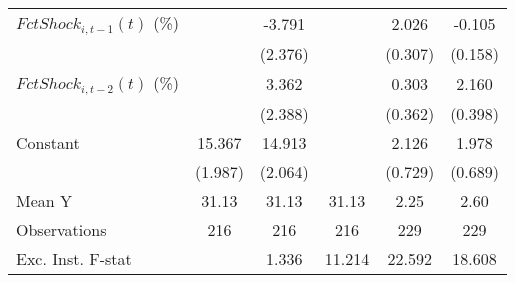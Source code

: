 {\begin{tabular}{l*{5}{c}}
\addlinespace
$ FctShock_{i,t-1}(t)$ (\%)&                     &      -3.791         &                     &       2.026\sym{***}&      -0.105         \\
                    &                     &     (2.376)         &                     &     (0.307)         &     (0.158)         \\
\addlinespace
$ FctShock_{i,t-2}(t)$ (\%)&                     &       3.362         &                     &       0.303         &       2.160\sym{***}\\
                    &                     &     (2.388)         &                     &     (0.362)         &     (0.398)         \\
\addlinespace
Constant            &      15.367\sym{***}&      14.913\sym{***}&                     &       2.126\sym{**} &       1.978\sym{**} \\
                    &     (1.987)         &     (2.064)         &                     &     (0.729)         &     (0.689)         \\
\midrule
Mean Y              &       31.13         &       31.13         &       31.13         &        2.25         &        2.60         \\
Observations        &         216         &         216         &         216         &         229         &         229         \\
Exc. Inst. F-stat   &                     &       1.336         &      11.214         &      22.592         &      18.608         \\
\bottomrule
\end{tabular}
}
